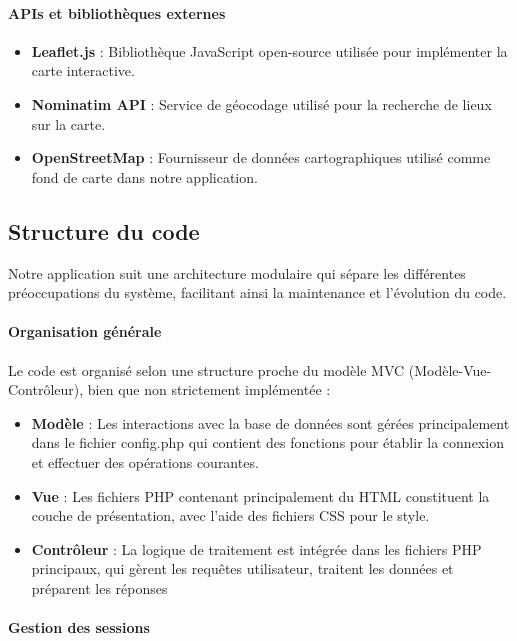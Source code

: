\documentclass[a4paper,12pt]{article}
\begin{document}
\paragraph{APIs et bibliothèques externes}
\begin{itemize}
    \item \textbf{Leaflet.js} : Bibliothèque JavaScript open-source utilisée pour implémenter la carte interactive.
    \item \textbf{Nominatim API} : Service de géocodage utilisé pour la recherche de lieux sur la carte.
    \item \textbf{OpenStreetMap} : Fournisseur de données cartographiques utilisé comme fond de carte dans notre application.
\end{itemize}

\subsection{Structure du code}

Notre application suit une architecture modulaire qui sépare les différentes préoccupations du système, facilitant ainsi la maintenance et l'évolution du code.

\paragraph{Organisation générale}
Le code est organisé selon une structure proche du modèle MVC (Modèle-Vue-Contrôleur), bien que non strictement implémentée :
\begin{itemize}
    \item \textbf{Modèle} : Les interactions avec la base de données sont gérées principalement dans le fichier config.php qui contient des fonctions pour établir la connexion et effectuer des opérations courantes.
    \item \textbf{Vue} : Les fichiers PHP contenant principalement du HTML constituent la couche de présentation, avec l'aide des fichiers CSS pour le style.
    \item \textbf{Contrôleur} : La logique de traitement est intégrée dans les fichiers PHP principaux,
qui gèrent les requêtes utilisateur, traitent les données et préparent les réponses
\end{itemize}

\paragraph{Gestion des sessions}
\end{document}
